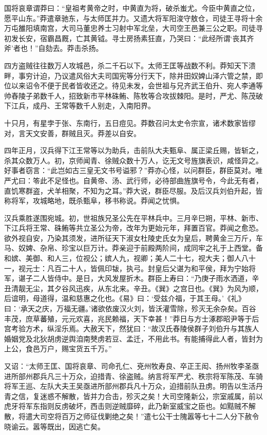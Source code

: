 \documentclass[12pt,UTF8]{ctexbook}
\begin{document}
国将哀章谓莽曰：“皇祖考黄帝之时，中黄直为将，破杀蚩尤。今臣中黄直之位，愿平山东。”莽遣章驰东，与太师匡并力。又遗大将军阳浚守敖仓，司徒王寻将十余万屯雒阳填南宫，大司马董忠养士习射中军北垒，大司空王邑兼三公之职。司徒寻初发长安，宿霸昌厩，亡其黄钺。寻士房扬素狂直，乃哭曰：“此经所谓‘丧其齐斧’者也！”自劾去。莽击杀扬。



四方盗贼往往数万人攻城邑，杀二千石以下。太师王匡等战数不利。莽知天下溃畔，事穷计迫，乃议遣风俗大夫司国宪等分行天下，除井田奴婢山泽六管之禁，即位以来诏令不便于民者皆收还之。待见未发，会世祖与兄齐武王伯升、宛人李通等帅舂陵子弟数千人，招致新市平林硃鲔、陈牧等合攻拔棘阳。是时，严尤、陈茂破下江兵，成丹、王常等数千人别走，入南阳界。



十只月，有星孛于张、东南行，五日痘见。莽数召问太史令宗宣，诸术数家皆缪对，言天文安善，群贼且灭。莽差以自安。



四年正月，汉兵得下江王常等以为助兵，击前队大夫甄阜、属正梁丘赐，皆斩之，杀其众数万人。初，京师闻青、徐贼众数十万人，讫无文号旌旗表识，咸怪异之。好事者窃言：“此岂如古三皇无文书号谥邪？”莽亦心怪，以问群臣，群臣莫对。唯严尤曰：笭此不足怪也。自黄帝、汤、武行师，必待部曲旌旗号令，今此无有者，直饥寒群盗，犬羊相聚，不知为之耳。”莽大说，群臣尽服。及后汉兵刘伯升起，皆称将军，攻城略地，既杀甄阜，移书称说。莽闻之忧惧。



汉兵乘胜遂围宛城。初，世祖族兄圣公先在平林兵中。三月辛巳朔，平林、新市、下江兵将王常、硃鲔等共立圣公为帝，改年为更始元年，拜置百官。莽闻之愈恐。欲外视自安，乃染其须发，进所征天下淑女杜陵史氏女为皇后，聘黄金三万斤，车马、奴婢、杂帛、珍宝以巨万计。莽亲迎于前殿两阶间，成同牢之礼于上西堂。备和嫔、美御、和人三，位视公；嫔人九，视卿；美人二十七，视大夫；御人八十一，视元士：凡百二十人，皆佩印韨，执弓。封皇后父谌为和平侯，拜为宁始将军，谌子二人皆侍中。是日，大风发屋折木。群臣上寿曰：“乃庚子雨水洒道，辛丑清靓无尘，其夕谷风迅疾，从东北来。辛丑。《巽》之宫日也。《巽》为风为顺，后谊明，母道得，温和慈惠之化也。《易》曰：‘受兹介福，于其王母。’《礼》曰：‘承天之庆，万福无疆。’诸欲依废汉火刘，皆沃灌雪除，殄灭无余杂矣。百谷丰茂，庶草蕃殖，元元欢喜，兆民赖福，天下幸甚！”莽日与方士涿郡昭尹等于后宫考验方术，纵淫乐焉。大赦天下，然犹曰：“故汉氏舂陵侯群子刘伯升与其族人婚姻党及北狄胡虏逆舆洎南僰虏若豆、孟迁，不用此书。有能捕得此人者，皆封为上公，食邑万户，赐宝货五千万。”



又诏：“太师王匡、国将哀章、司命孔仁、兗州牧寿良、卒正王闳、扬州牧李圣亟进所部州郡兵凡三十万众，迫措青、徐盗贼。纳言将军严尤、秩宗将军陈茂、车骑将军王巡、左队大夫王吴亟进所部州郡兵凡十万众，迫措前队丑虏。明告以生活丹青之信，复迷惑不解散，皆并力合击，殄灭之矣！大司空隆新公，宗室戚属，前以虎牙将军东指则反虏破坏，西击则逆贼靡碎，此乃新室威宝之臣也。如黠贼不解散，将遣大司空将百万之师征伐剿绝之矣！”遣七公干士隗嚣等七十二人分下赦令晓谕云。嚣等既出，因逃亡矣。
\end{document}
